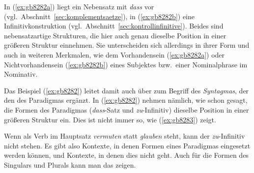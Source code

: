 \begin{exe}
  \ex\label{ex:gb8282}
  \begin{xlist}
  \end{xlist}
\end{exe}

In (\ref{ex:gb8282a}) liegt ein Nebensatz mit \textit{dass} vor (vgl.\ Abschnitt~\ref{sec:komplementsaetze}), in (\ref{ex:gb8282b}) eine Infinitivkonstruktion (vgl.\ Abschnitt~\ref{sec:kontrollinfinitive}).
Beides sind nebensatzartige Strukturen, die hier auch genau dieselbe Position in einer größeren Struktur einnehmen.
Sie unterscheiden sich allerdings in ihrer Form und auch in weiteren Merkmalen, wie \zB dem Vorhandensein (\ref{ex:gb8282a}) oder Nichtvorhandensein (\ref{ex:gb8282b}) eines Subjektes bzw.\ einer Nominalphrase im Nominativ.

Das Beispiel (\ref{ex:gb8282}) leitet damit auch über zum Begriff des \textit{Syntagmas}, der den des Paradigmas ergänzt.
In (\ref{ex:gb8282}) nehmen nämlich, wie schon gesagt, die Formen des Paradigmas (\textit{dass}-Satz und \textit{zu}-Infinitiv) dieselbe Position in einer größeren Struktur ein.
Dies ist nicht immer so, wie (\ref{ex:gb8283}) zeigt.

\begin{exe}
  \ex\label{ex:gb8283} 
  \begin{xlist}
  \end{xlist}
\end{exe}

Wenn als Verb im Hauptsatz \textit{vermuten} statt \textit{glauben} steht, kann der \textit{zu}-Infinitiv nicht stehen.
Es gibt also Kontexte, in denen Formen eines Paradigmas eingesetzt werden können, und Kontexte, in denen dies nicht geht.
Auch für die Formen des Singulars und Plurals kann man das zeigen.

\begin{exe}
  \ex\label{ex:gb8284}
  \begin{xlist}
  \end{xlist}
\end{exe}

